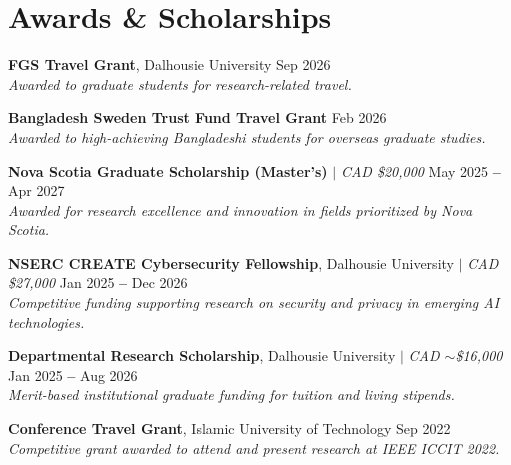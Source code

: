 \documentclass[letterpaper,11pt]{article}
\begin{document}
\section{Awards \& Scholarships}
  \vspace{-2pt}
  \begin{enumerate}[leftmargin=0.25in, label={[\arabic*]}]
    \small{
      \item \textbf{FGS Travel Grant}, Dalhousie University \hfill Sep 2026 \\[-2pt]
      \textit{Awarded to graduate students for research-related travel.} \vspace{-1pt}

      \item \textbf{Bangladesh Sweden Trust Fund Travel Grant} \hfill Feb 2026 \\[-2pt]
      \textit{Awarded to high-achieving Bangladeshi students for overseas graduate studies.} \vspace{-1pt}

      \item \textbf{Nova Scotia Graduate Scholarship (Master's)} $|$ \textit{CAD \$20,000} \hfill May 2025 \textbf{--} Apr 2027 \\[-2pt]
      \textit{Awarded for research excellence and innovation in fields prioritized by Nova Scotia.} \vspace{-1pt}

      \item \textbf{NSERC CREATE Cybersecurity Fellowship}, Dalhousie University $|$ \textit{CAD \$27,000} \hfill Jan 2025 \textbf{--} Dec 2026 \\[-2pt]
      \textit{Competitive funding supporting research on security and privacy in emerging AI technologies.} \vspace{-1pt}

      \item \textbf{Departmental Research Scholarship}, Dalhousie University $|$ \textit{CAD $\sim$\$16,000} \hfill Jan 2025 \textbf{--} Aug 2026 \\[-2pt]
      \textit{Merit-based institutional graduate funding for tuition and living stipends.} \vspace{-1pt}

      \item \textbf{Conference Travel Grant}, Islamic University of Technology \hfill Sep 2022 \\[-2pt]
      \textit{Competitive grant awarded to attend and present research at IEEE ICCIT 2022.} \vspace{-1pt}

}
\end{enumerate}
\end{document}
